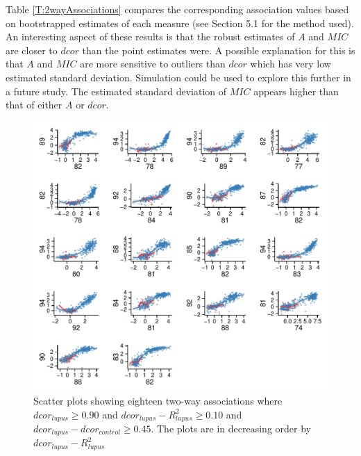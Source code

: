 \documentclass[a4paper, 12pt]{report}
\begin{document}
Table \ref{T:2wayAssociations} compares the corresponding association values based on bootstrapped estimates of each measure (see Section 5.1 for the method used). An interesting aspect of these results is that the robust estimates of $A$ and $MIC$ are closer to $dcor$ than the point estimates were. A possible explanation for this is that $A$ and $MIC$ are more sensitive to outliers than $dcor$ which has very low estimated standard deviation. Simulation could be used to explore this further in a future study. The estimated standard deviation of $MIC$ appears higher than that of either $A$ or $dcor$.




\begin{figure}[H]
\begin{centering}
\includegraphics[width=\textwidth]{2wayTop.pdf}
\caption{Scatter plots showing eighteen two-way associations where $dcor_{lupus} \ge 0.90$ and $dcor_{lupus} - R^2_{lupus} \ge 0.10$ and $dcor_{lupus} -dcor_{control} \ge 0.45$. The plots are in decreasing order  by $dcor_{lupus} - R^2_{lupus}$} 
\label{F:2wayTop}
\end{centering}
\end{figure}
\end{document}
